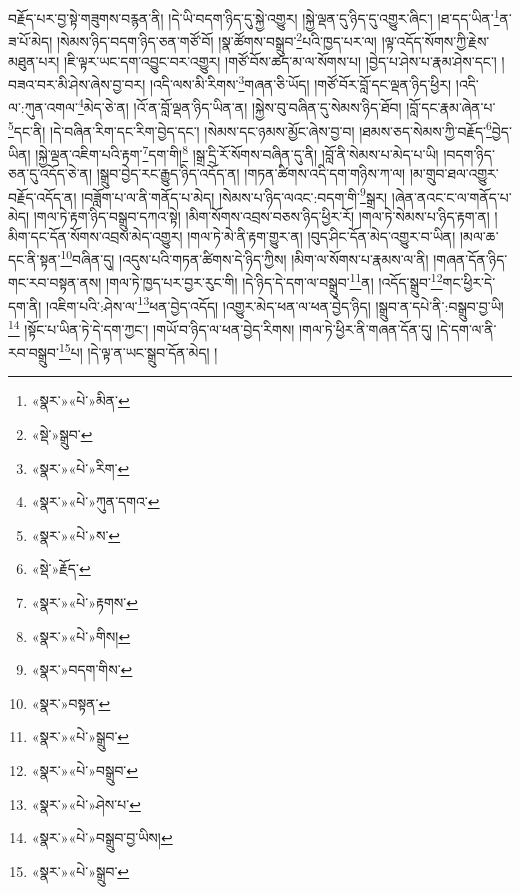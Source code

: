 བརྗོད་པར་བྱ་སྟེ་གཟུགས་བརྙན་ནི། །དེ་ཡི་བདག་ཉིད་དུ་སྐྱེ་འགྱུར། །སྐྱེ་ལྡན་དུ་ཉིད་དུ་འགྱུར་ཞིང་། །ཐ་དད་ཡིན་\footnote{«སྣར་»«པེ་»མིན་}ན་ཟ་པོ་མེད། །སེམས་ཉིད་བདག་ཉིད་ཅན་གཙོ་བོ། །སྣ་ཚོགས་བསྒྲུབ་\footnote{«སྡེ་»སྒྲུབ་}པའི་ཁྱད་པར་ལ། །ལྟ་འདོད་སོགས་ཀྱི་རྗེས་མཐུན་པར། །ཇི་ལྟར་ཡང་དག་འབྱུང་བར་འགྱུར། །གཙོ་བོས་ཚད་མ་ལ་སོགས་པ། །བྱེད་པ་ཤེས་པ་རྣམ་ཤེས་དང་། །བཟའ་བར་མི་ཤེས་ཞེས་བྱ་བར། །འདི་ལས་མི་རིགས་\footnote{«སྣར་»«པེ་»རིག་}གཞན་ཅི་ཡོད། །གཙོ་བོར་བློ་དང་ལྡན་ཉིད་ཕྱིར། །འདི་ལ་:ཀུན་འགལ་\footnote{«སྣར་»«པེ་»ཀུན་དགའ་}མེད་ཅེ་ན། །འོ་ན་བློ་ལྡན་ཉིད་ཡིན་ན། །སྐྱེས་བུ་བཞིན་དུ་སེམས་ཉིད་ཐོབ། །བློ་དང་རྣམ་ཞེན་པ་\footnote{«སྣར་»«པེ་»ས་}དང་ནི། །དེ་བཞིན་རིག་དང་རིག་བྱེད་དང་། །སེམས་དང་ཉམས་མྱོང་ཞེས་བྱ་བ། །ཐམས་ཅད་སེམས་ཀྱི་བརྗོད་\footnote{«སྡེ་»རྗོད་}བྱེད་ཡིན། །སྐྱེ་ལྡན་འཇིག་པའི་རྟག་\footnote{«སྣར་»«པེ་»རྟགས་}དག་གི།\footnote{«སྣར་»«པེ་»གིས།} །སྒྲ་དྲི་རོ་སོགས་བཞིན་དུ་ནི། །བློ་ནི་སེམས་པ་མེད་པ་ཡི། །བདག་ཉིད་ཅན་དུ་འདོད་ཅེ་ན། །སྒྲུབ་བྱེད་རང་རྒྱུད་ཉིད་འདོད་ན། །གཏན་ཚིགས་འདི་དག་གཉིས་ཀ་ལ། །མ་གྲུབ་ཐལ་འགྱུར་བརྗོད་འདོད་ན། །བཟློག་པ་ལ་ནི་གནོད་པ་མེད། །སེམས་པ་ཉིད་ལའང་:བདག་གི་\footnote{«སྣར་»བདག་གིས་}སྒྲར། །ཞེན་ནའང་ང་ལ་གནོད་པ་མེད། །གལ་ཏེ་རྟག་ཉིད་བསྒྲུབ་དཀའ་སྟེ། །མིག་སོགས་འབྲས་བཅས་ཉིད་ཕྱིར་རོ། །གལ་ཏེ་སེམས་པ་ཉིད་རྟག་ན། །མིག་དང་དོན་སོགས་འབྲས་མེད་འགྱུར། །གལ་ཏེ་མེ་ནི་རྟག་གྱུར་ན། །བུད་ཤིང་དོན་མེད་འགྱུར་བ་ཡིན། །མལ་ཆ་དང་ནི་སྟན་\footnote{«སྣར་»བསྟན་}བཞིན་དུ། །འདུས་པའི་གཏན་ཚིགས་དེ་ཉིད་ཀྱིས། །མིག་ལ་སོགས་པ་རྣམས་ལ་ནི། །གཞན་དོན་ཉིད་གང་རབ་བསྟན་ནས། །གལ་ཏེ་ཁྱད་པར་བྱར་རུང་གི། །དེ་ཉིད་དེ་དག་ལ་བསྒྲུབ་\footnote{«སྣར་»«པེ་»སྒྲུབ་}ན། །འདོད་སྒྲུབ་\footnote{«སྣར་»«པེ་»བསྒྲུབ་}གང་ཕྱིར་དེ་དག་ནི། །འཇིག་པའི་:ཤེས་ལ་\footnote{«སྣར་»«པེ་»ཤེས་པ་}ཕན་བྱེད་འདོད། །འགྱུར་མེད་ཕན་ལ་ཕན་བྱེད་ཉིད། །སྒྲུབ་ན་དཔེ་ནི་:བསྒྲུབ་བྱ་ཡི།\footnote{«སྣར་»«པེ་»བསྒྲུབ་བྱ་ཡིས།} །སྟོང་པ་ཡིན་ཏེ་དེ་དག་ཀྱང་། །གཡོ་བ་ཉིད་ལ་ཕན་བྱེད་རིགས། །གལ་ཏེ་ཕྱིར་ནི་གཞན་དོན་དུ། །དེ་དག་ལ་ནི་རབ་བསྒྲུབ་\footnote{«སྣར་»«པེ་»སྒྲུབ་}པ། །དེ་ལྟ་ན་ཡང་སྒྲུབ་དོན་མེད། །

